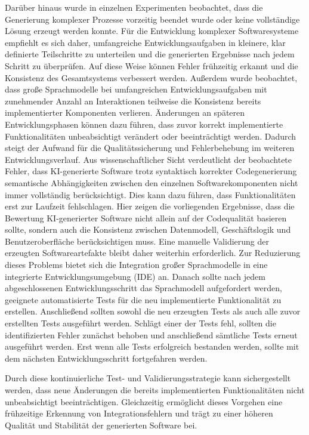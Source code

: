 Darüber hinaus wurde in einzelnen Experimenten beobachtet, dass die Generierung komplexer Prozesse vorzeitig beendet wurde oder keine vollständige Lösung erzeugt werden konnte. Für die Entwicklung komplexer Softwaresysteme empfiehlt es sich daher, umfangreiche Entwicklungsaufgaben in kleinere, klar definierte Teilschritte zu unterteilen und die generierten Ergebnisse nach jedem Schritt zu überprüfen. Auf diese Weise können Fehler frühzeitig erkannt und die Konsistenz des Gesamtsystems verbessert werden.
Außerdem wurde beobachtet, dass große Sprachmodelle bei umfangreichen Entwicklungsaufgaben mit zunehmender Anzahl an Interaktionen teilweise die Konsistenz bereits implementierter Komponenten verlieren. Änderungen an späteren Entwicklungsphasen können dazu führen, dass zuvor korrekt implementierte Funktionalitäten unbeabsichtigt verändert oder beeinträchtigt werden. Dadurch steigt der Aufwand für die Qualitätssicherung und Fehlerbehebung im weiteren Entwicklungsverlauf.
Aus wissenschaftlicher Sicht verdeutlicht der beobachtete Fehler, dass KI-generierte Software trotz syntaktisch korrekter Codegenerierung semantische Abhängigkeiten zwischen den einzelnen Softwarekomponenten nicht immer vollständig berücksichtigt. Dies kann dazu führen, dass Funktionalitäten erst zur Laufzeit fehlschlagen. Hier zeigen die vorliegenden Ergebnisse, dass die Bewertung KI-generierter Software nicht allein auf der Codequalität basieren sollte, sondern auch die Konsistenz zwischen Datenmodell, Geschäftslogik und Benutzeroberfläche berücksichtigen muss. Eine manuelle Validierung der erzeugten Softwareartefakte bleibt daher weiterhin erforderlich.
Zur Reduzierung dieses Problems bietet sich die Integration großer Sprachmodelle in eine integrierte Entwicklungsumgebung (IDE) an. Danach sollte nach jedem abgeschlossenen Entwicklungsschritt das Sprachmodell aufgefordert werden, geeignete automatisierte Tests für die neu implementierte Funktionalität zu erstellen. Anschließend sollten sowohl die neu erzeugten Tests als auch alle zuvor erstellten Tests ausgeführt werden. Schlägt einer der Tests fehl, sollten die identifizierten Fehler zunächst behoben und anschließend sämtliche Tests erneut ausgeführt werden. Erst wenn alle Tests erfolgreich bestanden werden, sollte mit dem nächsten Entwicklungsschritt fortgefahren werden.

Durch diese kontinuierliche Test- und Validierungsstrategie kann sichergestellt werden, dass neue Änderungen die bereits implementierten Funktionalitäten nicht unbeabsichtigt beeinträchtigen. Gleichzeitig ermöglicht dieses Vorgehen eine frühzeitige Erkennung von Integrationsfehlern und trägt zu einer höheren Qualität und Stabilität der generierten Software bei. \\

